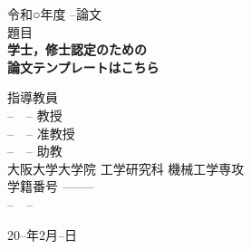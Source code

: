 
\begin{titlepage}
  \centering

{\Large 令和○年度 --論文} 
\vspace{1cm} \\
 {\Large 題目} \\
{\huge \textbf{学士，修士認定のための\protect\\論文テンプレートはこちら}}\\ 
\vspace{3cm}

  

指導教員 \vspace{0.1cm} \\
{\Large --　-- 教授} \\
{\Large --　-- 准教授} \\
{\Large --　-- 助教} \\
\vspace{1cm}
{\Large 大阪大学大学院 工学研究科 機械工学専攻}\\
  {\Large 学籍番号 --------} 
  \vspace{0.5cm} \\
  {\LARGE --　--}
\vspace{2.5cm}
  
 
  \vfill
  

    {\Large 20--年2月--日}

   
  \vfill
  
 
   
  \end{titlepage}
